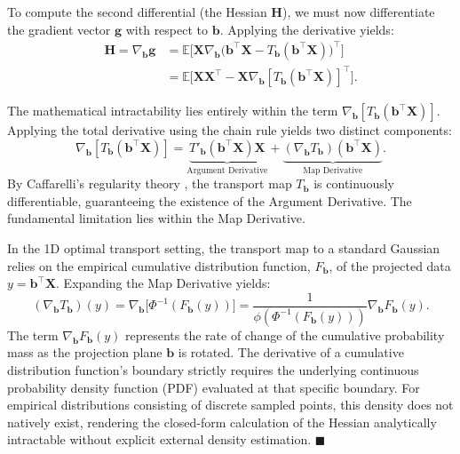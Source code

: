 \documentclass[12pt,a4paper,twoside,openany]{book}
\begin{document}
To compute the second differential (the Hessian $\mathbf{H}$), we must now differentiate the gradient vector $\mathbf{g}$ with respect to $\mathbf{b}$. Applying the derivative yields:
\begin{align}
    \mathbf{H} = \nabla_{\mathbf{b}} \mathbf{g} &= \mathbb{E}\Big[ \mathbf{X} \nabla_{\mathbf{b}} \big( \mathbf{b}^\top \mathbf{X} - T_{\mathbf{b}}(\mathbf{b}^\top \mathbf{X}) \big)^\top \Big] \nonumber \\
    &= \mathbb{E}\Big[ \mathbf{X} \mathbf{X}^\top - \mathbf{X} \nabla_{\mathbf{b}} [T_{\mathbf{b}}(\mathbf{b}^\top \mathbf{X})]^\top \Big].
\end{align}

The mathematical intractability lies entirely within the term $\nabla_{\mathbf{b}} [T_{\mathbf{b}}(\mathbf{b}^\top \mathbf{X})]$. 
Applying the total derivative using the chain rule yields two distinct components:
\begin{equation}
    \nabla_{\mathbf{b}} [T_{\mathbf{b}}(\mathbf{b}^\top \mathbf{X})] = \underbrace{T'_{\mathbf{b}}(\mathbf{b}^\top \mathbf{X}) \mathbf{X}}_{\text{Argument Derivative}} + \underbrace{(\nabla_{\mathbf{b}} T_{\mathbf{b}})(\mathbf{b}^\top \mathbf{X})}_{\text{Map Derivative}}.
\end{equation}
By Caffarelli's regularity theory \cite{caffarelli1992}, the transport map $T_{\mathbf{b}}$ is continuously differentiable, 
guaranteeing the existence of the Argument Derivative. The fundamental limitation lies within the Map Derivative. 

In the 1D optimal transport setting, the transport map to a standard Gaussian relies on the empirical cumulative distribution function, 
$F_{\mathbf{b}}$, of the projected data $y = \mathbf{b}^\top \mathbf{X}$. Expanding the Map Derivative yields:
\begin{equation}
    (\nabla_{\mathbf{b}} T_{\mathbf{b}})(y) = \nabla_{\mathbf{b}} \big[ \Phi^{-1}(F_{\mathbf{b}}(y)) \big] = \frac{1}{\phi(\Phi^{-1}(F_{\mathbf{b}}(y)))} \nabla_{\mathbf{b}} F_{\mathbf{b}}(y).
\end{equation}
The term $\nabla_{\mathbf{b}} F_{\mathbf{b}}(y)$ represents the rate of change of the cumulative probability mass as the projection plane $\mathbf{b}$ is rotated. 
The derivative of a cumulative distribution function's boundary strictly requires the underlying continuous probability density function (PDF) evaluated at that specific boundary. 
For empirical distributions consisting of discrete sampled points, this density does not natively exist, rendering the closed-form calculation of 
the Hessian analytically intractable without explicit external density estimation. $\blacksquare$
\end{document}
